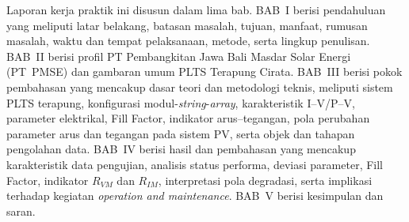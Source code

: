 Laporan kerja praktik ini disusun dalam lima bab. BAB~I berisi pendahuluan yang
meliputi latar belakang, batasan masalah, tujuan, manfaat, rumusan masalah,
waktu dan tempat pelaksanaan, metode, serta lingkup penulisan. BAB~II berisi
profil PT Pembangkitan Jawa Bali Masdar Solar Energi (PT~PMSE) dan gambaran
umum PLTS Terapung Cirata. BAB~III berisi pokok pembahasan yang mencakup dasar
teori dan metodologi teknis, meliputi sistem PLTS terapung, konfigurasi
modul-\textit{string}-\textit{array}, karakteristik I--V/P--V, parameter
elektrikal, Fill Factor, indikator arus--tegangan, pola perubahan parameter
arus dan tegangan pada sistem PV, serta objek dan tahapan pengolahan data.
BAB~IV berisi hasil dan pembahasan yang mencakup karakteristik data pengujian,
analisis status performa, deviasi parameter, Fill Factor, indikator $R_{VM}$
dan $R_{IM}$, interpretasi pola degradasi, serta implikasi terhadap kegiatan
\textit{operation and maintenance}. BAB~V berisi kesimpulan dan saran.